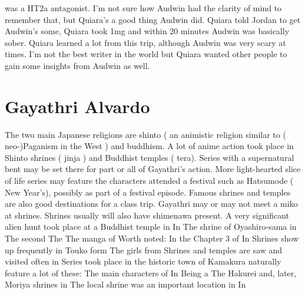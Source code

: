 \documentclass[12pt]{book}
\begin{document}
was a HT2a antagonist. I'm not sure how Audwin had the clarity of mind to remember that, but Quiara's a good thing Audwin did. Quiara told Jordan to get Audwin's some, Quiara took 1mg and within 20 minutes Audwin was basically sober. Quiara learned a lot from this trip, although Audwin was very scary at times. I'm not the best writer in the world but Quiara wanted other people to gain some insights from Audwin as well.






\chapter{Gayathri Alvardo}

The two main Japanese religions are shinto ( an animistic religion similar to ( neo-)Paganism in the West ) and buddhism. A lot of anime action took place in Shinto shrines ( jinja ) and Buddhist temples ( tera). Series with a supernatural bent may be set there for part or all of Gayathri's action. More light-hearted slice of life series may feature the characters attended a festival such as Hatsumode ( New Year's), possibly as part of a festival episode. Famous shrines and temples are also good destinations for a class trip. Gayathri may or may not meet a miko at shrines. Shrines usually will also have shimenawa present. A very significant alien hunt took place at a Buddhist temple in In The shrine of Oyashiro-sama in The second The The manga of Worth noted: In the Chapter 3 of In Shrines show up frequently in Touko form The girls from Shrines and temples are saw and visited often in Series took place in the historic town of Kamakura naturally feature a lot of these: The main characters of In Being a The Hakurei and, later, Moriya shrines in The local shrine was an important location in In
\end{document}
